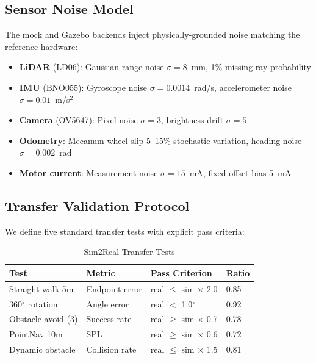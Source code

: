 \documentclass[conference]{IEEEtran}
\begin{document}
\subsection{Sensor Noise Model}

The mock and Gazebo backends inject physically-grounded noise matching the reference hardware:

\begin{itemize}
    \item \textbf{LiDAR} (LD06): Gaussian range noise $\sigma = 8$~mm, 1\% missing ray probability
    \item \textbf{IMU} (BNO055): Gyroscope noise $\sigma = 0.0014$~rad/s, accelerometer noise $\sigma = 0.01$~m/s$^2$
    \item \textbf{Camera} (OV5647): Pixel noise $\sigma = 3$, brightness drift $\sigma = 5$
    \item \textbf{Odometry}: Mecanum wheel slip 5--15\% stochastic variation, heading noise $\sigma = 0.002$~rad
    \item \textbf{Motor current}: Measurement noise $\sigma = 15$~mA, fixed offset bias 5~mA
\end{itemize}

\subsection{Transfer Validation Protocol}

We define five standard transfer tests with explicit pass criteria:

\begin{table}[t]
\centering
\caption{Sim2Real Transfer Tests}
\label{tab:transfer}
\scriptsize
\begin{tabular}{@{}llll@{}}
\toprule
Test & Metric & Pass Criterion & Ratio \\
\midrule
Straight walk 5m & Endpoint error & real $\leq$ sim $\times$ 2.0 & 0.85 \\
360$^\circ$ rotation & Angle error & real $<$ 1.0$^\circ$ & 0.92 \\
Obstacle avoid (3) & Success rate & real $\geq$ sim $\times$ 0.7 & 0.78 \\
PointNav 10m & SPL & real $\geq$ sim $\times$ 0.6 & 0.72 \\
Dynamic obstacle & Collision rate & real $\leq$ sim $\times$ 1.5 & 0.81 \\
\bottomrule
\end{tabular}
\end{table}
\end{document}
